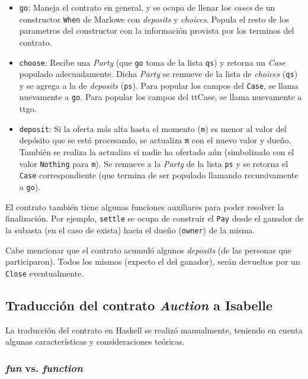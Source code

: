\documentclass[12pt]{book}
\begin{document}
\begin{itemize}
    \item \texttt{go}: Maneja el contrato en general, y se ocupa de llenar los \textit{cases} de un constructor \texttt{When} de Marlowe con \textit{deposits} y \textit{choices}. Popula el resto de los parametros del constructor con la información provista por los terminos del contrato.
    \item \texttt{choose}: Recibe una \textit{Party} (que \texttt{go} toma de la lista \texttt{qs}) y retorna un \textit{Case} populado adecuadamente. Dicha \textit{Party} se remueve de la lista de \textit{choices} (\texttt{qs}) y se agrega a la de \textit{deposits} (\texttt{ps}). Para popular los campos del \texttt{Case}, se llama nuevamente a \texttt{go}. Para popular los campos del ttCase, se llama nuevamente a ttgo.
    \item \texttt{deposit}: Si la oferta más alta hasta el momento (\texttt{m}) es menor al valor del depósito que se está procesando, se actualiza \texttt{m} con el nuevo valor y dueño. También se realiza la actualiza si nadie ha ofertado aún (simbolizado con el valor \texttt{Nothing} para \texttt{m}). Se remueve a la \textit{Party} de la lista \texttt{ps} y se retorna el \texttt{Case} correspondiente (que termina de ser populado llamando recursivamente a \texttt{go}).
\end{itemize}

El contrato también tiene algunas funciones auxiliares para poder resolver la finalización. Por ejemplo, \texttt{settle} se ocupa de construir el \texttt{Pay} desde el ganador de la subasta (en el caso de exista) hacia el dueño (\texttt{owner}) de la misma.

Cabe mencionar que el contrato acumuló algunos \textit{deposits} (de las personas que participaron). Todos los mismos (expecto el del ganador), serán devueltos por un \texttt{Close} eventualmente.


\subsection{Traducción del contrato \textit{Auction} a Isabelle}

La traducción del contrato en Haskell se realizó manualmente, teniendo en cuenta algunas características y consideraciones teóricas.

\subsubsection{\textit{fun} vs. \textit{function}}\label{sssec:fun_function}
\end{document}
